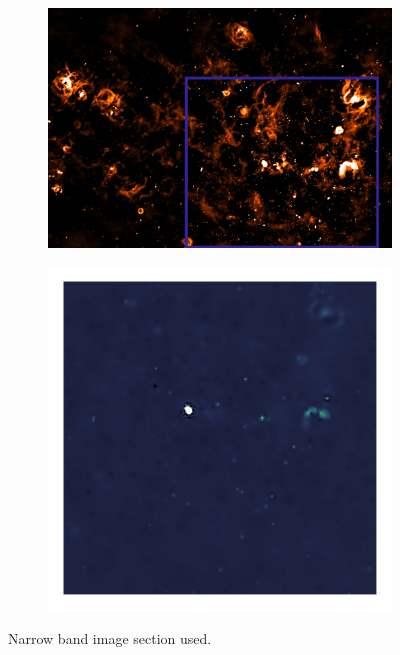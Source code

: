 \begin{figure}[h]
	\centering
	\begin{subfigure}[b]{0.4\linewidth}
		\includegraphics[width=1.0\linewidth]{./chapters/10.results/LMC/meerkat_cutout.png}
	\end{subfigure}
	\begin{subfigure}[b]{0.28\linewidth}
		\includegraphics[width=1.0\linewidth, clip, trim={0.72in 0.72in 0.72in 0.72in}]{./chapters/10.results/MSClean/Natural-CLEAN_naked.png}
	\end{subfigure}
	\caption{Narrow band image section used.}
	\label{results:cutout}
\end{figure}

